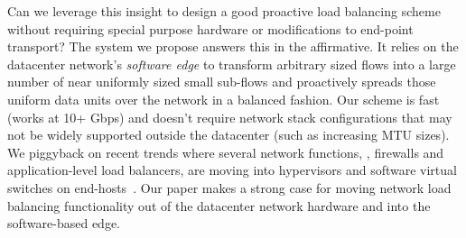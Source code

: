 Can we leverage this insight to design a good proactive load balancing scheme without requiring special purpose hardware or modifications to end-point transport? The system we propose answers this in the affirmative. It relies on the datacenter network's {\em software edge} to transform arbitrary sized flows into a large number of near uniformly sized small sub-flows and proactively spreads those uniform data units over the network in a balanced fashion. Our scheme is fast (works at 10+ Gbps) and doesn't require network stack configurations that may not be widely supported outside the datacenter (such as increasing MTU sizes). We piggyback on recent trends where several network functions, \eg{}, firewalls and application-level load balancers, are moving into hypervisors and software virtual switches on end-hosts~\cite{nv-mtd,ovs-extending,eden}. Our paper makes a strong case for moving network load balancing functionality out of the datacenter network hardware and into the software-based edge.


\iffalse
Fortunately, many commonly deployed network topologies like 2-tier folded Clos (leaf-spine) already meet the network symmetry 
requirements though asymmetry may occur due to failures and should be handled. The main challenge then is to achieve uniformity 
in flow sizes i.e. a mechanism that can efficiently multiplex and de-multiplex logical flows into a more uniformly sized smaller 
sub-flow units. This mapping and the load balancing of the resulting units should ideally be done 
in the network itself instead of transport layer.
\fi


